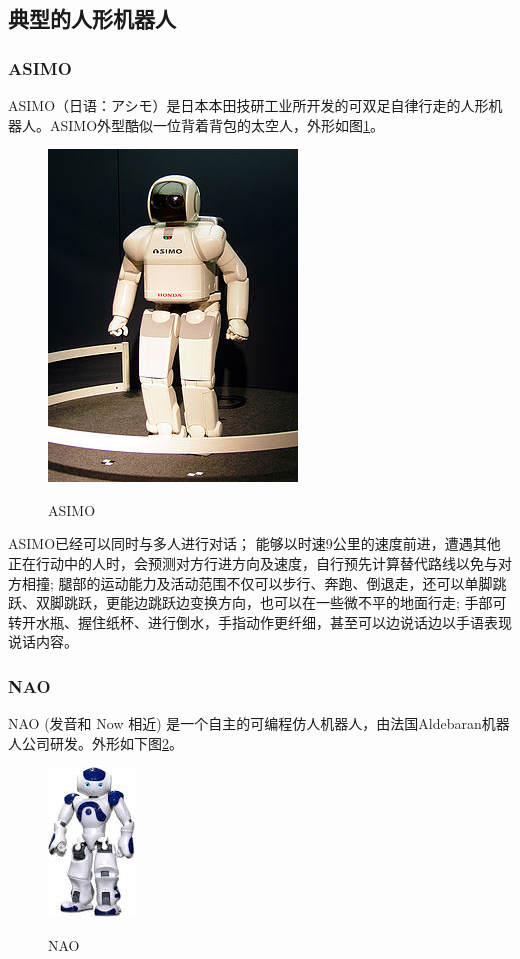 \documentclass[10pt,a4paper]{article}
\begin{document}
\begin{CJK*}{UTF8}{gkai}
\subsection{典型的人形机器人}
\subsubsection{ASIMO}
ASIMO（日语：アシモ）是日本本田技研工业所开发的可双足自律行走的人形机器人。ASIMO外型酷似一位背着背包的太空人，外形如图\ref{fig:ASIMO}。\\
\begin{figure}[!htbp]
	\centering
	\caption{ASIMO}  
		\includegraphics[scale=0.30]{figs/HONDA_ASIMO.jpg}
    	\label{fig:ASIMO}
\end{figure}


ASIMO已经可以同时与多人进行对话；
能够以时速9公里的速度前进，遭遇其他正在行动中的人时，会预测对方行进方向及速度，自行预先计算替代路线以免与对方相撞;
腿部的运动能力及活动范围不仅可以步行、奔跑、倒退走，还可以单脚跳跃、双脚跳跃，更能边跳跃边变换方向，也可以在一些微不平的地面行走;
手部可转开水瓶、握住纸杯、进行倒水，手指动作更纤细，甚至可以边说话边以手语表现说话内容。


\subsubsection{NAO}
NAO (发音和 Now 相近) 是一个自主的可编程仿人机器人，由法国Aldebaran机器人公司研发。外形如下图\ref{fig:NAO}。\\
\begin{figure}[!htbp]
	\centering
	\caption{NAO}  
		\includegraphics[scale=0.40]{figs/NAO.jpg}
    	\label{fig:NAO}
\end{figure}


\end{CJK*}
\end{document}
